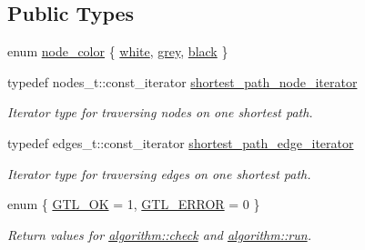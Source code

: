 \subsection*{Public Types}
\begin{DoxyCompactItemize}
\item 
enum \mbox{\hyperlink{classdijkstra_a2bdd8d3b57860b5715d01e65664e810f}{node\+\_\+color}} \{ \mbox{\hyperlink{classdijkstra_a2bdd8d3b57860b5715d01e65664e810faad3592711b48819ad438e34c2bb1fb2d}{white}}, 
\mbox{\hyperlink{classdijkstra_a2bdd8d3b57860b5715d01e65664e810fa6c55d71322cdf1f158dc5e1e0c239427}{grey}}, 
\mbox{\hyperlink{classdijkstra_a2bdd8d3b57860b5715d01e65664e810fa958572ed471642bb14fce76ae9284bb5}{black}}
 \}
\item 
typedef nodes\+\_\+t\+::const\+\_\+iterator \mbox{\hyperlink{classdijkstra_a2ba040b6e45343a2c3675788968d9113}{shortest\+\_\+path\+\_\+node\+\_\+iterator}}
\begin{DoxyCompactList}\small\item\em Iterator type for traversing nodes on one shortest path. \end{DoxyCompactList}\item 
typedef edges\+\_\+t\+::const\+\_\+iterator \mbox{\hyperlink{classdijkstra_afb9a918f95b13aefcef331896fe3b41c}{shortest\+\_\+path\+\_\+edge\+\_\+iterator}}
\begin{DoxyCompactList}\small\item\em Iterator type for traversing edges on one shortest path. \end{DoxyCompactList}\item 
enum \{ \mbox{\hyperlink{classalgorithm_af1a0078e153aa99c24f9bdf0d97f6710a5114c20e4a96a76b5de9f28bf15e282b}{G\+T\+L\+\_\+\+OK}} = 1, 
\mbox{\hyperlink{classalgorithm_af1a0078e153aa99c24f9bdf0d97f6710a6fcf574690bbd6cf710837a169510dd7}{G\+T\+L\+\_\+\+E\+R\+R\+OR}} = 0
 \}
\begin{DoxyCompactList}\small\item\em Return values for \mbox{\hyperlink{classalgorithm_a76361fb03ad1cf643affc51821e43bed}{algorithm\+::check}} and \mbox{\hyperlink{classalgorithm_a734b189509a8d6b56b65f8ff772d43ca}{algorithm\+::run}}. \end{DoxyCompactList}\end{DoxyCompactItemize}

